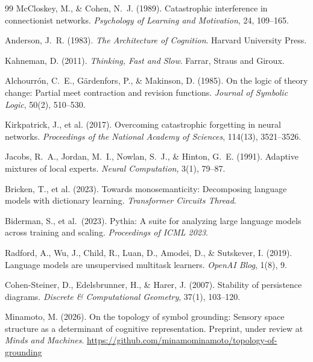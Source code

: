 \documentclass[12pt]{article}
\begin{document}
\begin{thebibliography}{99}
McCloskey, M., \& Cohen, N.~J. (1989).
Catastrophic interference in connectionist networks.
\textit{Psychology of Learning and Motivation}, 24, 109--165.

Anderson, J.~R. (1983).
\textit{The Architecture of Cognition}.
Harvard University Press.

Kahneman, D. (2011).
\textit{Thinking, Fast and Slow}.
Farrar, Straus and Giroux.

Alchourrón, C.~E., Gärdenfors, P., \& Makinson, D. (1985).
On the logic of theory change: Partial meet contraction and revision
functions.
\textit{Journal of Symbolic Logic}, 50(2), 510--530.

Kirkpatrick, J., et al. (2017).
Overcoming catastrophic forgetting in neural networks.
\textit{Proceedings of the National Academy of Sciences},
114(13), 3521--3526.

Jacobs, R.~A., Jordan, M.~I., Nowlan, S.~J., \& Hinton, G.~E. (1991).
Adaptive mixtures of local experts.
\textit{Neural Computation}, 3(1), 79--87.

Bricken, T., et al. (2023).
Towards monosemanticity: Decomposing language models with
dictionary learning.
\textit{Transformer Circuits Thread}.

Biderman, S., et al.\ (2023).
Pythia: A suite for analyzing large language models across training
and scaling.
\textit{Proceedings of ICML 2023}.

Radford, A., Wu, J., Child, R., Luan, D., Amodei, D., \& Sutskever, I.
(2019).
Language models are unsupervised multitask learners.
\textit{OpenAI Blog}, 1(8), 9.

Cohen-Steiner, D., Edelsbrunner, H., \& Harer, J. (2007).
Stability of persistence diagrams.
\textit{Discrete \& Computational Geometry}, 37(1), 103--120.

Minamoto, M. (2026).
On the topology of symbol grounding: Sensory space structure as a
determinant of cognitive representation.
Preprint, under review at \textit{Minds and Machines}.
\url{https://github.com/minamominamoto/topology-of-grounding}

\end{thebibliography}
\end{document}
